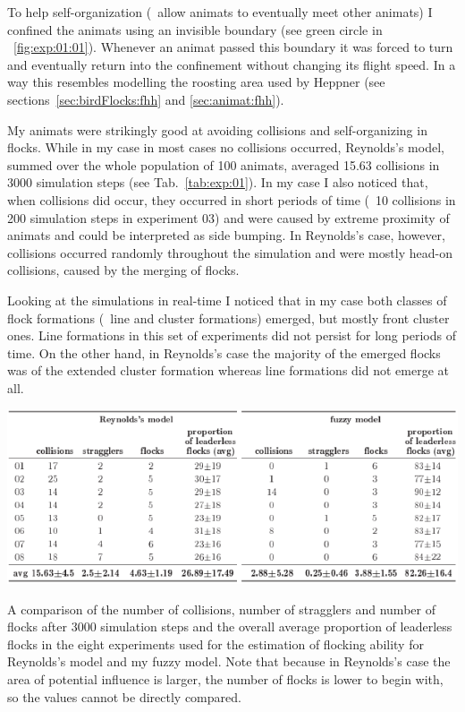 %
To help self-organization (\ie\ allow animats to eventually meet other animats) I confined the animats using an invisible boundary (see green circle in \fig~\ref{fig:exp:01:01}). Whenever an animat passed this boundary it was forced to turn and eventually return into the confinement without changing its flight speed. In a way this resembles modelling the roosting area used by Heppner  \cite{heppner:1990} (see sections~\ref{sec:birdFlocks:fhh} and \ref{sec:animat:fhh}). 

My animats were strikingly good at avoiding collisions and self-organizing in flocks. While in my case in most cases no collisions occurred, Reynolds's model, summed over the whole population of 100 animats, averaged 15.63 collisions in 3000 simulation steps (see Tab.~\ref{tab:exp:01}). In my case I also noticed that, when collisions did occur, they occurred in short periods of time (\eg\ 10 collisions in 200 simulation steps in experiment 03) and were caused by extreme proximity of animats and could be interpreted as side bumping. In Reynolds's case, however, collisions occurred randomly throughout the simulation and were mostly head-on collisions, caused by the merging of flocks. 

Looking at the simulations in real-time I noticed that in my case both classes of flock formations (\ie\ line and cluster formations) emerged, but mostly front cluster ones. Line formations in this set of experiments did not persist for long periods of time. On the other hand, in Reynolds's case the majority of the emerged flocks was of the extended cluster formation whereas line formations did not emerge at all. 

\begin{table}%
\includegraphics{tab[exp01]}
\caption{A comparison of the number of collisions, number of stragglers and number of flocks after 3000 simulation steps and the overall average proportion of leaderless flocks in the eight experiments used for the estimation of flocking ability for Reynolds's \cite{reynolds:1999} model and my fuzzy model. Note that because in Reynolds's case the area of potential influence is larger, the number of flocks is lower to begin with, so the values cannot be directly compared.}
\label{tab:exp:01}
\end{table}

